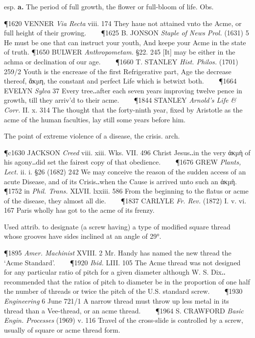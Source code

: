 \begin{description}[wide, labelwidth=!, labelindent=0pt]
\begin{myenumerate}
 esp. \textbf{a.} The period of full growth, the flower or full-bloom 
of life. Obs. 

\P 1620 VENNER \textit{Via Recta} viii. 174 They haue not attained vnto the Acme, or full
height of their growing.    
\P 1625 B. JONSON \textit{Staple of News Prol.} (1631) 5 He must
be one that can instruct your youth, And keepe your Acme in the state of truth.
\P 1650 BULWER \textit{Anthropometam.} §22. 245 [It] may be either in the achma or
declination of our age.    
\P 1660 T. STANLEY \textit{Hist. Philos.} (1701) 259/2 Youth is
the encrease of the first Refrigerative part, Age the decrease thereof, ἄκµη,
the constant and perfect Life which is betwixt both.    
\P 1664 EVELYN \textit{Sylva} 37
Every tree‥after each seven years improving twelve pence in growth, till they
arriv'd to their acme.    
\P 1844 STANLEY \textit{Arnold's Life \& Corr.} II. x. 314 The
thought that the forty-ninth year, fixed by Aristotle as the acme of the human
faculties, lay still some years before him.

 The point of extreme violence of a disease, the crisis. arch. 

\P c1630 JACKSON \textit{Creed} viii. xiii. Wks. VII. 496 Christ Jesus‥in the very ἀκµὴ
of his agony‥did set the fairest copy of that obedience.    
\P 1676 GREW \textit{Plants, Lect.} ii. i. §26 (1682) 242 We may conceive the 
reason of the sudden access of
an acute Disease, and of its Crisis‥when the Cause is arrived unto such an ἀκµὴ.
\P 1752 in \textit{Phil. Trans.} XLVII. lxxiii. 586 From the beginning to the flatus or
acme of the disease, they almost all die.    
\P 1837 CARLYLE \textit{Fr. Rev.} (1872) I. v.
vi. 167 Paris wholly has got to the acme of its frenzy.
 
 Used attrib. to designate (a screw having) a type of modified square
thread whose grooves have sides inclined at an angle of 29°. 

\P 1895 \textit{Amer. Machinist} XVIII. 2 Mr. Handy has named the new thread the ‘Acme
Standard’.    
\P 1920 \textit{Ibid.} LIII. 105 The Acme thread was not designed for any
particular ratio of pitch for a given diameter although W. S. Dix‥recommended
that the ratios of pitch to diameter be in the proportion of one half the number
of threads or twice the pitch of the U.S. standard screw.    
\P 1930 \textit{Engineering} 6 June 721/1 A narrow thread must throw up less 
metal in its thread than a Vee-thread, or an acme thread.    
\P 1964 S. CRAWFORD \textit{Basic Engin. Processes} (1969)
v. 116 Travel of the cross-slide is controlled by a screw, usually of square or
acme thread form.
\end{myenumerate}




\end{description}
